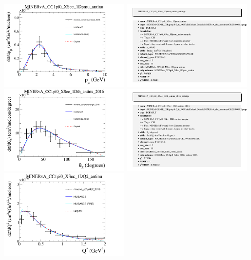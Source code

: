 \documentclass{article}
\begin{document}
\centering
\includegraphics[width=0.49\textwidth]{figures/minerva_cc1pi0muonmom_2016_comp.png}
\includegraphics[width=0.49\textwidth]{figures/minerva_cc1pi0muonmom_2016_info.png}
\centering
\includegraphics[width=0.49\textwidth]{figures/minerva_cc1pi0pionangle_2016_comp.png}
\includegraphics[width=0.49\textwidth]{figures/minerva_cc1pi0pionangle_2016_info.png}
\centering
\includegraphics[width=0.49\textwidth]{figures/minerva_cc1pi0q2_2016_comp.png}
\end{document}
